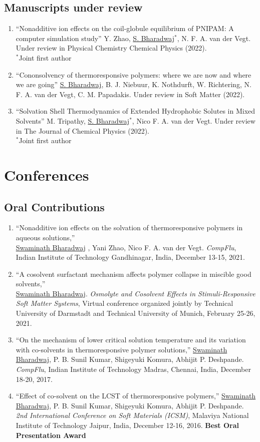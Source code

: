 \documentclass[a4paper,14pt]{article}
\begin{document}
\subsection*{\normalsize Manuscripts under review}
\begin{enumerate}
\item
\enquote{Nonadditive ion effects on the coil-globule equilibrium of PNIPAM: A computer simulation study} Y. Zhao, \underline{S. Bharadwaj}$^{\ast}$, N. F. A. van der Vegt. Under review in Physical Chemistry Chemical Physics (2022).\\
$^{\ast}$Joint first author
\item
\enquote{Cononsolvency of thermoresponsive polymers: where we are now and where we are going} \underline{S. Bharadwaj}, B. J. Niebuur, K. Nothdurft, W. Richtering, N. F. A. van der Vegt, C. M. Papadakis. Under review in Soft Matter (2022).
\item
\enquote{Solvation Shell Thermodynamics of Extended Hydrophobic Solutes in
Mixed Solvents} M. Tripathy, \underline{S. Bharadwaj}$^{\ast}$, Nico F. A. van
der Vegt. Under review in The Journal of Chemical Physics (2022).\\
$^{\ast}$Joint first author
\end{enumerate}
\section*{Conferences}
\subsection*{\normalsize Oral Contributions}
\begin{enumerate}
\item
\enquote{Nonadditive ion effects on the solvation of thermoresponsive polymers
in aqueous solutions,}\\ \underline{Swaminath Bharadwaj} , Yani Zhao, Nico F. A.
van der Vegt. \textit{CompFlu}, Indian Institute of Technology Gandhinagar,
India, December 13-15, 2021.
\item
\enquote{A cosolvent surfactant mechanism affects polymer collapse in miscible
good solvents,} \\\underline{Swaminath Bharadwaj}. \textit{Osmolyte and Cosolvent
Effects in Stimuli-Responsive Soft Matter Systems}, Virtual conference
organized jointly by Technical University of Darmstadt and Technical University
of Munich, February 25-26, 2021.
\item
\enquote{On the mechanism of lower critical solution temperature and its
variation with co-solvents in thermoresponsive polymer solutions,}
\underline{Swaminath Bharadwaj}, P. B. Sunil Kumar, Shigeyuki Komura, Abhijit
P. Deshpande. \textit{CompFlu}, Indian Institute of Technology Madras,  Chennai,
India, December 18-20, 2017.
\item
\enquote{Effect of co-solvent on the LCST of thermoresponsive
polymers,} \underline{Swaminath Bharadwaj}, P. B. Sunil Kumar, Shigeyuki Komura,
Abhijit P. Deshpande. \textit{2nd International Conference on Soft Materials
(ICSM)}, Malaviya National Institute of Technology Jaipur, India, December
12-16, 2016. \textbf{Best Oral Presentation Award}
\end{enumerate}
\end{document}

